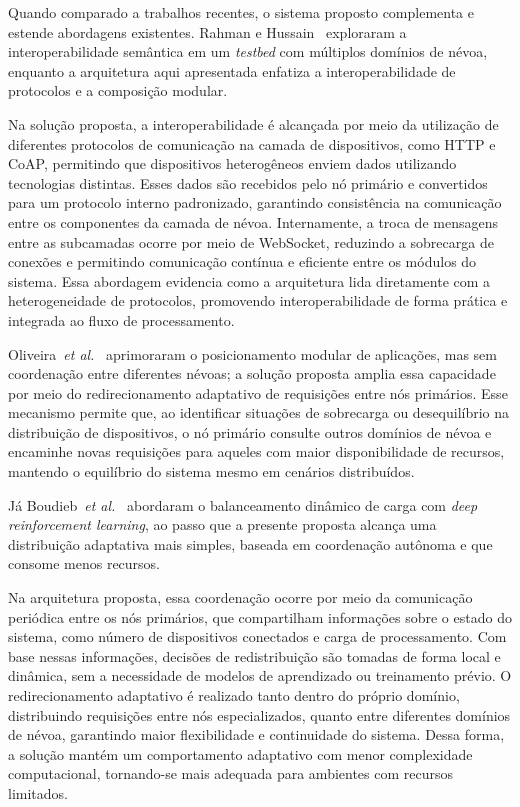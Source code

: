 Quando comparado a trabalhos recentes, o sistema proposto complementa e estende abordagens existentes. 
Rahman e Hussain~\cite{rahman2024} exploraram a interoperabilidade semântica em um \textit{testbed} com múltiplos domínios de névoa, enquanto a arquitetura aqui apresentada enfatiza a interoperabilidade de protocolos e a composição modular. 

Na solução proposta, a interoperabilidade é alcançada por meio da utilização de diferentes protocolos de comunicação na camada de dispositivos, como HTTP e CoAP, permitindo que dispositivos heterogêneos enviem dados utilizando tecnologias distintas. Esses dados são recebidos pelo nó primário e convertidos para um protocolo interno padronizado, garantindo consistência na comunicação entre os componentes da camada de névoa. Internamente, a troca de mensagens entre as subcamadas ocorre por meio de WebSocket, reduzindo a sobrecarga de conexões e permitindo comunicação contínua e eficiente entre os módulos do sistema. Essa abordagem evidencia como a arquitetura lida diretamente com a heterogeneidade de protocolos, promovendo interoperabilidade de forma prática e integrada ao fluxo de processamento.

Oliveira~\textit{et al.}~\cite{oliveira2024} aprimoraram o posicionamento modular de aplicações, mas sem coordenação entre diferentes névoas; a solução proposta amplia essa capacidade por meio do redirecionamento adaptativo de requisições entre nós primários. Esse mecanismo permite que, ao identificar situações de sobrecarga ou desequilíbrio na distribuição de dispositivos, o nó primário consulte outros domínios de névoa e encaminhe novas requisições para aqueles com maior disponibilidade de recursos, mantendo o equilíbrio do sistema mesmo em cenários distribuídos.

Já Boudieb~\textit{et al.}~\cite{boudieb2024} abordaram o balanceamento dinâmico de carga com \textit{deep reinforcement learning}, ao passo que a presente proposta alcança uma distribuição adaptativa mais simples, baseada em coordenação autônoma e que consome menos recursos. 

Na arquitetura proposta, essa coordenação ocorre por meio da comunicação periódica entre os nós primários, que compartilham informações sobre o estado do sistema, como número de dispositivos conectados e carga de processamento. Com base nessas informações, decisões de redistribuição são tomadas de forma local e dinâmica, sem a necessidade de modelos de aprendizado ou treinamento prévio. O redirecionamento adaptativo é realizado tanto dentro do próprio domínio, distribuindo requisições entre nós especializados, quanto entre diferentes domínios de névoa, garantindo maior flexibilidade e continuidade do sistema. Dessa forma, a solução mantém um comportamento adaptativo com menor complexidade computacional, tornando-se mais adequada para ambientes com recursos limitados.
